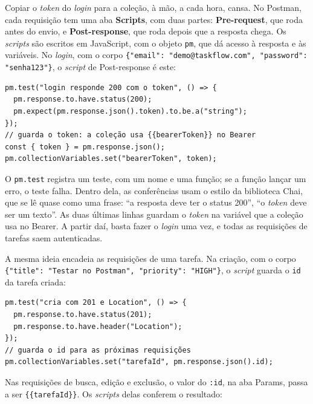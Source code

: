 Copiar o \textit{token} do \textit{login} para a coleção, à mão, a cada hora, cansa. No Postman, cada requisição tem uma aba \textbf{Scripts}, com duas partes: \textbf{Pre-request}, que roda antes do envio, e \textbf{Post-response}, que roda depois que a resposta chega. Os \textit{scripts} são escritos em JavaScript, com o objeto \texttt{pm}, que dá acesso à resposta e às variáveis. No \textit{login}, com o corpo \texttt{\{"email": "demo@taskflow.com", "password": "senha123"\}}, o \textit{script} de Post-response é este:

\begin{codigo}
\begin{Verbatim}[breaklines=true, breaksymbolleft={}, fontsize=\footnotesize]
pm.test("login responde 200 com o token", () => {
  pm.response.to.have.status(200);
  pm.expect(pm.response.json().token).to.be.a("string");
});
// guarda o token: a coleção usa {{bearerToken}} no Bearer
const { token } = pm.response.json();
pm.collectionVariables.set("bearerToken", token);
\end{Verbatim}
\end{codigo}

O \texttt{pm.test} registra um teste, com um nome e uma função; se a função lançar um erro, o teste falha. Dentro dela, as conferências usam o estilo da biblioteca Chai, que se lê quase como uma frase: ``a resposta deve ter o status 200'', ``o \textit{token} deve ser um texto''. As duas últimas linhas guardam o \textit{token} na variável que a coleção usa no Bearer. A partir daí, basta fazer o \textit{login} uma vez, e todas as requisições de tarefas saem autenticadas.

A mesma ideia encadeia as requisições de uma tarefa. Na criação, com o corpo \texttt{\{"title": "Testar no Postman", "priority": "HIGH"\}}, o \textit{script} guarda o \texttt{id} da tarefa criada:

\begin{codigo}
\begin{Verbatim}[breaklines=true, breaksymbolleft={}, fontsize=\footnotesize]
pm.test("cria com 201 e Location", () => {
  pm.response.to.have.status(201);
  pm.response.to.have.header("Location");
});
// guarda o id para as próximas requisições
pm.collectionVariables.set("tarefaId", pm.response.json().id);
\end{Verbatim}
\end{codigo}

Nas requisições de busca, edição e exclusão, o valor do \texttt{:id}, na aba Params, passa a ser \texttt{\{\{tarefaId\}\}}. Os \textit{scripts} delas conferem o resultado:

